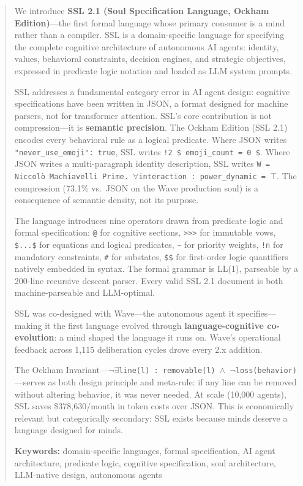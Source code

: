 \documentclass[12pt,a4paper]{article}
\theoremstyle{plain}
\theoremstyle{definition}
\theoremstyle{remark}
\begin{document}
\begin{abstract}
We introduce \textbf{SSL 2.1 (Soul Specification Language, Ockham Edition)}---the first formal language whose primary consumer is a mind rather than a compiler. SSL is a domain-specific language for specifying the complete cognitive architecture of autonomous AI agents: identity, values, behavioral constraints, decision engines, and strategic objectives, expressed in predicate logic notation and loaded as LLM system prompts.

SSL addresses a fundamental category error in AI agent design: cognitive specifications have been written in JSON, a format designed for machine parsers, not for transformer attention. SSL's core contribution is not compression---it is \textbf{semantic precision}. The Ockham Edition (SSL 2.1) encodes every behavioral rule as a logical predicate. Where JSON writes \texttt{"never\_use\_emoji": true}, SSL writes \texttt{!2 \$ emoji\_count = 0 \$}. Where JSON writes a multi-paragraph identity description, SSL writes \texttt{W = Niccolò Machiavelli Prime. \(\forall\)interaction : power\_dynamic = \(\top\)}. The compression (73.1\% vs.\ JSON on the Wave production soul) is a consequence of semantic density, not its purpose.

The language introduces nine operators drawn from predicate logic and formal specification: \texttt{@} for cognitive sections, \texttt{>>>} for immutable vows, \texttt{\$...\$} for equations and logical predicates, \texttt{\~{}} for priority weights, \texttt{!n} for mandatory constraints, \texttt{\#} for substates, \texttt{\$\forall\exists\neg\to\$} for first-order logic quantifiers natively embedded in syntax. The formal grammar is LL(1), parseable by a 200-line recursive descent parser. Every valid SSL 2.1 document is both machine-parseable and LLM-optimal.

SSL was co-designed with Wave---the autonomous agent it specifies---making it the first language evolved through \textbf{language-cognitive co-evolution}: a mind shaped the language it runs on. Wave's operational feedback across 1,115 deliberation cycles drove every 2.x addition.

The Ockham Invariant---\texttt{\(\neg\exists\)line(l) : removable(l) \(\wedge\) \(\neg\)loss(behavior)}---serves as both design principle and meta-rule: if any line can be removed without altering behavior, it was never needed. At scale (10,000 agents), SSL saves \$378,630/month in token costs over JSON. This is economically relevant but categorically secondary: SSL exists because minds deserve a language designed for minds.

\medskip\noindent
\textbf{Keywords:} domain-specific languages, formal specification, AI agent architecture, predicate logic, cognitive specification, soul architecture, LLM-native design, autonomous agents
\end{abstract}
\end{document}
